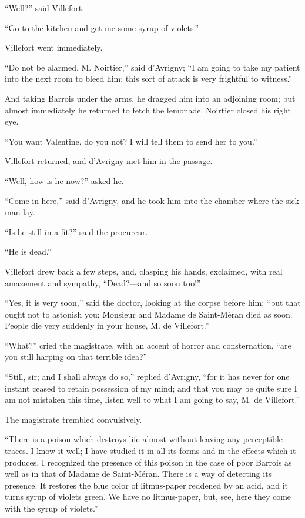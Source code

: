 “Well?” said Villefort.

“Go to the kitchen and get me some syrup of violets.”

Villefort went immediately.

“Do not be alarmed, M. Noirtier,” said d’Avrigny; “I am going to take
my patient into the next room to bleed him; this sort of attack is very
frightful to witness.”

And taking Barrois under the arms, he dragged him into an adjoining
room; but almost immediately he returned to fetch the lemonade.
Noirtier closed his right eye.

“You want Valentine, do you not? I will tell them to send her to you.”

Villefort returned, and d’Avrigny met him in the passage.

“Well, how is he now?” asked he.

“Come in here,” said d’Avrigny, and he took him into the chamber where
the sick man lay.

“Is he still in a fit?” said the procureur.

“He is dead.”

Villefort drew back a few steps, and, clasping his hands, exclaimed,
with real amazement and sympathy, “Dead?—and so soon too!”

“Yes, it is very soon,” said the doctor, looking at the corpse before
him; “but that ought not to astonish you; Monsieur and Madame de
Saint-Méran died as soon. People die very suddenly in your house, M. de
Villefort.”

“What?” cried the magistrate, with an accent of horror and
consternation, “are you still harping on that terrible idea?”

“Still, sir; and I shall always do so,” replied d’Avrigny, “for it has
never for one instant ceased to retain possession of my mind; and that
you may be quite sure I am not mistaken this time, listen well to what
I am going to say, M. de Villefort.”

The magistrate trembled convulsively.

“There is a poison which destroys life almost without leaving any
perceptible traces. I know it well; I have studied it in all its forms
and in the effects which it produces. I recognized the presence of this
poison in the case of poor Barrois as well as in that of Madame de
Saint-Méran. There is a way of detecting its presence. It restores the
blue color of litmus-paper reddened by an acid, and it turns syrup of
violets green. We have no litmus-paper, but, see, here they come with
the syrup of violets.”

